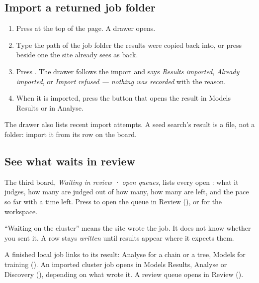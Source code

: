 \subsection{Import a returned job folder}\label{sec:jobs-inbox}
\begin{enumerate}
\item Press  at the top of the page. A drawer opens.
\item Type the path of the job folder the results were copied back into, or press  beside one the site already sees as back.
\item Press . The drawer follows the import and says \emph{Results imported},
  \emph{Already imported}, or \emph{Import refused — nothing was recorded} with the reason.
\item When it is imported, press the button that opens the result in Models \textrightarrow{}
  Results or in Analyse.
\end{enumerate}
The drawer also lists recent import attempts. A seed search's result is a file, not a folder: import
it from its row on the board.


\subsection{See what waits in review}\label{sec:jobs-review}
The third board, \emph{Waiting in review · open queues}, lists every open
: what it judges, how many are judged out of how many, how many are
left, and the pace so far with a time left. Press  to open the queue in Review
(), or  for the workspace.

\begin{watchout}
``Waiting on the cluster'' means the site wrote the job. It does not know whether you sent it. A
row stays \emph{written} until results appear where it expects them.
\end{watchout}

A finished local job links to its result: Analyse for a chain or a tree, Models for training
(). An imported cluster job opens in Models \textrightarrow{} Results,
Analyse or Discovery (), depending on what wrote it. A review queue opens in
Review ().

